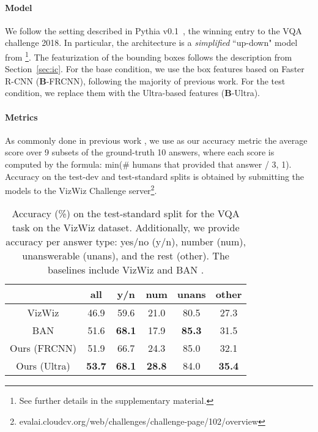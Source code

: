 \documentclass[11pt,a4paper]{article}
\begin{document}
\paragraph{Model}
We follow the setting described in Pythia v0.1~\cite{jiang18pythia}, the winning entry to the VQA challenge 2018.
In particular, the architecture is a \emph{simplified} ``up-down" model from \cite{anderson18bottomup}\footnote{See further details in the supplementary material.}.
The featurization of the bounding boxes follows the description from Section~\ref{sec:ic}.
For the base condition, we use the box features based on Faster R-CNN ({\bf B}-FRCNN), following the majority of previous work.
For the test condition, we replace them with the Ultra-based features ({\bf B}-Ultra).

\paragraph{Metrics}
As commonly done in previous work \cite{antol15vqa}, we use as our accuracy metric the average score over 9 subsets of the ground-truth 10 answers, where each score is computed by the formula:
min(\# humans that provided that answer / 3, 1).
Accuracy on the test-dev and test-standard splits is obtained by submitting the models to the VizWiz Challenge server\footnote{{evalai.cloudcv.org/web/challenges/challenge-page/102/overview}}.

\begin{table}[!t]
\small
\begin{center}
\begin{tabular}{c|c|c|c|c|c}
 & all & y/n & num & unans & other \\ \hline
VizWiz & 46.9 & 59.6 & 21.0 & 80.5 & 27.3 \\
BAN & 51.6 & \textbf{68.1} & 17.9 & \textbf{85.3} & 31.5 \\ \hline \hline
Ours (FRCNN) & 51.9 & 66.7 & 24.3 & 85.0 & 32.1 \\
Ours (Ultra) & \textbf{53.7} & \textbf{68.1} & \textbf{28.8} & 84.0 & \textbf{35.4} \\ \hline
\end{tabular}
\vspace{-7pt}
\caption {Accuracy (\%) on the test-standard split for the VQA task on the VizWiz dataset.
Additionally, we provide accuracy per answer type: yes/no (y/n), number (num), unanswerable (unans), and the rest (other).
The baselines include VizWiz \cite{gurari18vizwiz} and BAN \cite{kim18banvizwiz}.}
\vspace{-10pt}
\label{tab:results-vqa}
\end{center}
\end{table}
 
\end{document}
